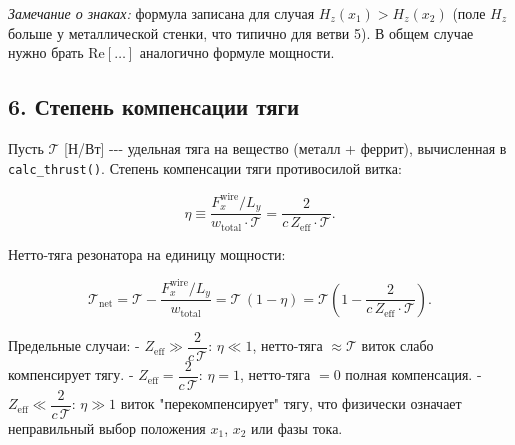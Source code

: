 \documentclass[11pt]{article}
\makeatletter
\newcommand{\boxspacing}{\kern\kvtcb@left@rule\kern\kvtcb@boxsep}
\newcommand{\prompt}[4]{
        {\ttfamily\llap{{\color{#2}[#3]:\hspace{3pt}#4}}\vspace{-\baselineskip}}
    }
\makeatother
\begin{document}
\emph{Замечание о знаках:} формула записана для случая
\(H_z(x_1) > H_z(x_2)\) (поле \(H_z\) больше у металлической стенки, что
типично для ветви 5). В общем случае нужно брать \(\mathrm{Re}[\ldots]\)
аналогично формуле мощности.

    \subsection{6. Степень компенсации
тяги}\label{ux441ux442ux435ux43fux435ux43dux44c-ux43aux43eux43cux43fux435ux43dux441ux430ux446ux438ux438-ux442ux44fux433ux438}

Пусть \(\mathcal{T}\) {[}Н/Вт{]} -\/-\/- удельная тяга на вещество
(металл + феррит), вычисленная в \texttt{calc\_thrust()}. Степень
компенсации тяги противосилой витка:

\begin{equation}
    \boxed{
        \eta \equiv
        \frac{F_x^{\mathrm{wire}}/L_y}{w_{\mathrm{total}}\cdot\mathcal{T}}
        = \frac{2}{c\,Z_{\mathrm{eff}}\cdot\mathcal{T}}.
    }
    \label{eq:eta}
\end{equation}

Нетто-тяга резонатора на единицу мощности:

\begin{equation}
    \mathcal{T}_{\mathrm{net}}
    = \mathcal{T} - \frac{F_x^{\mathrm{wire}}/L_y}{w_{\mathrm{total}}}
    = \mathcal{T}\,(1 - \eta)
    = \mathcal{T}\!\left(1 - \frac{2}{c\,Z_{\mathrm{eff}}\cdot\mathcal{T}}\right).
    \label{eq:T_net}
\end{equation}

Предельные случаи: - \(Z_{\mathrm{eff}} \gg \dfrac{2}{c\,\mathcal{T}}\):
\(\eta \ll 1\), нетто-тяга \(\approx \mathcal{T}\) виток слабо
компенсирует тягу. - \(Z_{\mathrm{eff}} = \dfrac{2}{c\,\mathcal{T}}\):
\(\eta = 1\), нетто-тяга \(= 0\) полная компенсация. -
\(Z_{\mathrm{eff}} \ll \dfrac{2}{c\,\mathcal{T}}\): \(\eta \gg 1\) виток
"перекомпенсирует" тягу, что физически означает неправильный выбор
положения \(x_1\), \(x_2\) или фазы тока.

    \begin{tcolorbox}[breakable, size=fbox, boxrule=1pt, pad at break*=1mm,colback=cellbackground, colframe=cellborder]
\prompt{In}{incolor}{ }{\boxspacing}
\begin{Verbatim}[commandchars=\\\{\}]

\end{Verbatim}
\end{tcolorbox}
\end{document}
